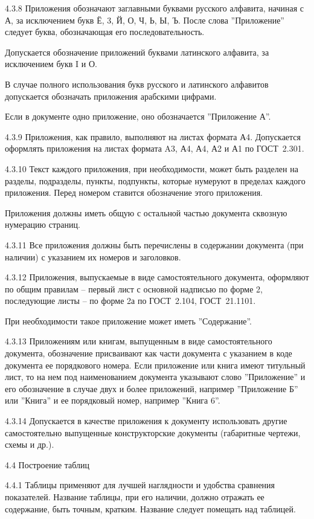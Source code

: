 4.3.8 Приложения обозначают заглавными буквами русского алфавита, начиная с А, за исключением букв Ё, 3, Й, О, Ч, Ь, Ы, Ъ. После слова ''Приложение'' следует буква, обозначающая его последовательность.

Допускается обозначение приложений буквами латинского алфавита, за исключением букв I и О.

В случае полного использования букв русского и латинского алфавитов допускается обозначать приложения арабскими цифрами.

Если в документе одно приложение, оно обозначается ''Приложение А''.

4.3.9 Приложения, как правило, выполняют на листах формата А4. Допускается оформлять приложения на листах формата A3, А4, А4, А2 и А1 по ГОСТ~2.301.

4.3.10 Текст каждого приложения, при необходимости, может быть разделен на разделы, подразделы, пункты, подпункты, которые нумеруют в пределах каждого приложения. Перед номером ставится обозначение этого приложения.

Приложения должны иметь общую с остальной частью документа сквозную нумерацию страниц.

4.3.11 Все приложения должны быть перечислены в содержании документа (при наличии) с указанием их номеров и заголовков.

4.3.12 Приложения, выпускаемые в виде самостоятельного документа, оформляют по общим правилам – первый лист с основной надписью по форме 2, последующие листы – по форме 2а по ГОСТ~2.104, ГОСТ~21.1101.

При необходимости такое приложение может иметь ''Содержание''.

4.3.13 Приложениям или книгам, выпущенным в виде самостоятельного документа, обозначение
присваивают как части документа с указанием в коде документа ее порядкового номера. Если приложение или книга имеют титульный лист, то на нем под наименованием документа указывают слово ''Приложение'' и его обозначение в случае двух и более приложений, например ''Приложение Б'' или ''Книга'' и ее порядковый номер, например ''Книга 6''.

4.3.14 Допускается в качестве приложения к документу использовать другие самостоятельно выпущенные конструкторские документы (габаритные чертежи, схемы и др.).

4.4 Построение таблиц

4.4.1 Таблицы применяют для лучшей наглядности и удобства сравнения показателей. Название таблицы, при его наличии, должно отражать ее содержание, быть точным, кратким. Название следует помещать над таблицей.

